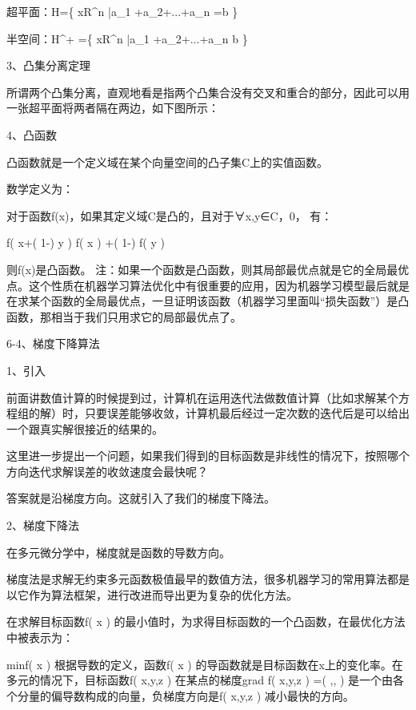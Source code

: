 \documentclass[11pt]{book}
\newcounter{#2}
\newcounter{#2}[#1]
\numberwithin{#2}{#1}
\begin{document}
超平面：H=\left\{ x\in R^{n} |a_{1} +a_{2}+...+a_{n} =b  \right\} 

半空间：H^{+} =\left\{ x\in R^{n} |a_{1} +a_{2}+...+a_{n} \geq b  \right\} 

3、凸集分离定理

所谓两个凸集分离，直观地看是指两个凸集合没有交叉和重合的部分，因此可以用一张超平面将两者隔在两边，如下图所示：

4、凸函数

凸函数就是一个定义域在某个向量空间的凸子集C上的实值函数。


数学定义为：

对于函数f(x)，如果其定义域C是凸的，且对于∀x,y∈C，0\leq \alpha {}， 有： 

f\left( \theta x+\left( 1-\theta  \right) y \right) \leq \theta f\left( x \right) +\left( 1-\theta  \right) f\left( y \right) 

则f(x)是凸函数。
注：如果一个函数是凸函数，则其局部最优点就是它的全局最优点。这个性质在机器学习算法优化中有很重要的应用，因为机器学习模型最后就是在求某个函数的全局最优点，一旦证明该函数（机器学习里面叫“损失函数”）是凸函数，那相当于我们只用求它的局部最优点了。

6-4、梯度下降算法

1、引入 

前面讲数值计算的时候提到过，计算机在运用迭代法做数值计算（比如求解某个方程组的解）时，只要误差能够收敛，计算机最后经过一定次数的迭代后是可以给出一个跟真实解很接近的结果的。

这里进一步提出一个问题，如果我们得到的目标函数是非线性的情况下，按照哪个方向迭代求解误差的收敛速度会最快呢？

答案就是沿梯度方向。这就引入了我们的梯度下降法。

2、梯度下降法

在多元微分学中，梯度就是函数的导数方向。

梯度法是求解无约束多元函数极值最早的数值方法，很多机器学习的常用算法都是以它作为算法框架，进行改进而导出更为复杂的优化方法。

在求解目标函数f\left( x \right) 的最小值时，为求得目标函数的一个凸函数，在最优化方法中被表示为：

minf\left( x \right) 
根据导数的定义，函数f\left( x \right) 的导函数就是目标函数在x上的变化率。在多元的情况下，目标函数f\left( x,y,z \right) 在某点的梯度grad f\left( x,y,z \right) =\left(   ,,  \right) 是一个由各个分量的偏导数构成的向量，负梯度方向是f\left( x,y,z \right) 减小最快的方向。
\end{document}
